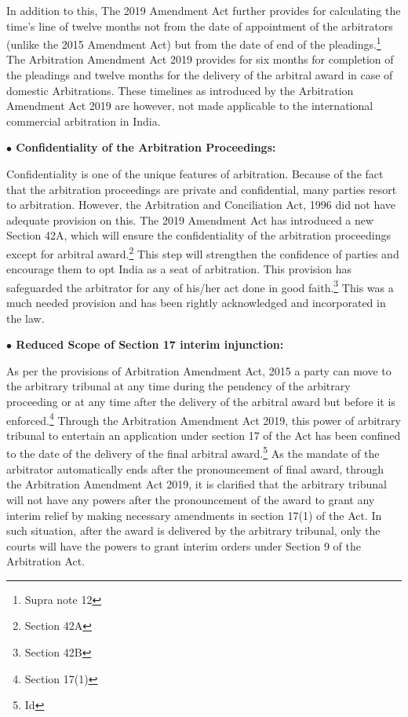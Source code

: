 \begin{multicols}{2}
\noi
In addition to this, The 2019 Amendment Act further provides for calculating the time's line
of twelve months not from the date of appointment of the arbitrators (unlike the 2015
Amendment Act) but from the date of end of the pleadings.\footnote{Supra note 12} The Arbitration Amendment
Act 2019 provides for six months for completion of the pleadings and twelve months for the
delivery of the arbitral award in case of domestic Arbitrations. These timelines as introduced
by the Arbitration Amendment Act 2019 are however, not made applicable to the
international commercial arbitration in India.

\noi
{\large \bfseries $\bullet$ Confidentiality of the Arbitration Proceedings:}

\noi
Confidentiality is one of the unique features of arbitration. Because of the fact that the
arbitration proceedings are private and confidential, many parties resort to arbitration.
However, the Arbitration and Conciliation Act, 1996 did not have adequate provision on this.
The 2019 Amendment Act has introduced a new Section 42A, which will ensure the
confidentiality of the arbitration proceedings except for arbitral award.\footnote{Section 42A} This step will
strengthen the confidence of parties and encourage them to opt India as a seat of arbitration.
This provision has safeguarded the arbitrator for any of his/her act done in good faith.\footnote{Section 42B} This
was a much needed provision and has been rightly acknowledged and incorporated in the
law.

\noi
{\large \bfseries $\bullet$ Reduced Scope of Section 17 interim injunction:}

\noi
As per the provisions of Arbitration Amendment Act, 2015 a party can move to the arbitrary
tribunal at any time during the pendency of the arbitrary proceeding or at any time after the
delivery of the arbitral award but before it is enforced.\footnote{Section 17(1)} Through the Arbitration Amendment
Act 2019, this power of arbitrary tribunal to entertain an application under section 17 of the
Act has been confined to the date of the delivery of the final arbitral award.\footnote{Id} As the mandate
of the arbitrator automatically ends after the pronouncement of final award, through the 
Arbitration Amendment Act 2019, it is clarified that the arbitrary tribunal will not have any
powers after the pronouncement of the award to grant any interim relief by making necessary
amendments in section 17(1) of the Act. In such situation, after the award is delivered by the
arbitrary tribunal, only the courts will have the powers to grant interim orders under Section 9
of the Arbitration Act.


\end{multicols}
